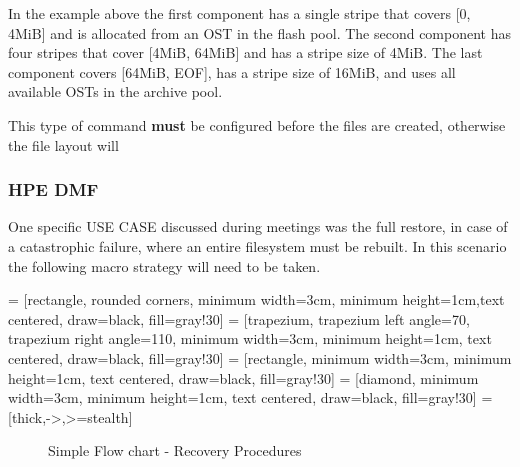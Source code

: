 \documentclass{article}
\begin{document}
In the example above the first component has a single stripe that covers [0, 4MiB] and is allocated from an OST in the flash pool. The second component has four stripes that cover [4MiB, 64MiB] and has a stripe size of 4MiB. The last component covers [64MiB, EOF], has a stripe size of 16MiB, and uses all available OSTs in the archive pool.

This type of command \textbf{must} be configured before the files are created, otherwise the file layout will 
\subsubsection{HPE DMF}
One specific USE CASE discussed during meetings was the full restore, in case of a catastrophic failure, where an entire filesystem must be rebuilt. In this scenario the following macro strategy will need to be taken.

 = [rectangle, rounded corners, minimum width=3cm, minimum height=1cm,text centered, draw=black, fill=gray!30]
 = [trapezium, trapezium left angle=70, trapezium right angle=110, minimum width=3cm, minimum height=1cm, text centered, draw=black, fill=gray!30]
 = [rectangle, minimum width=3cm, minimum height=1cm, text centered, draw=black, fill=gray!30]
 = [diamond, minimum width=3cm, minimum height=1cm, text centered, draw=black, fill=gray!30]
 = [thick,->,>=stealth]

\begin{figure}
\begin{center}
\caption{Simple Flow chart - Recovery Procedures}
\end{center}
\end{figure}
\end{document}
